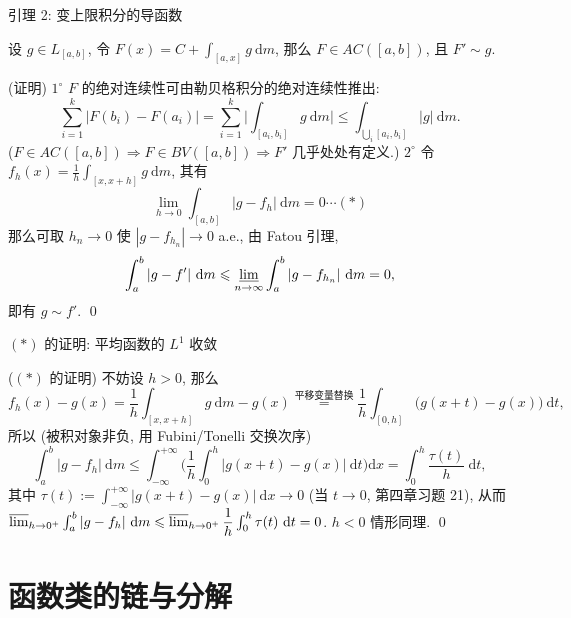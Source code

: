
\begin{frame}{引理 2: 变上限积分的导函数}

\begin{lem}
设 $g \in L_{[a, b]}$, 令 $F(x) = C + \int_{[a, x]} g ~ \mathrm{d} m$,
那么 $F \in AC([a, b])$, 且 $F' \sim g$.
\end{lem}

\startproof[bg=yellow, fg=red](证明)
$1^{\circ}$ $F$ 的绝对连续性可由勒贝格积分的绝对连续性推出:
\[
\sum_{i=1}^{k} \big| F(b_i) - F(a_i) \big|
= \sum_{i=1}^{k} \Big| \int_{[a_i, b_i]} g ~ \mathrm{d} m \Big|
\leqslant \int_{\bigcup_i [a_i, b_i]} |g| ~ \mathrm{d} m .
\]
($F \in AC([a, b]) \Rightarrow F \in BV([a, b]) \Rightarrow F'$ 几乎处处有定义.) \quad
$2^{\circ}$ 令 $f_h(x) = \frac1h \int_{[x, x+h]} g ~ \mathrm{d} m$,
其有
\[
\lim_{h \to 0} \int_{[a, b]} |g - f_h| ~ \mathrm{d} m = 0 \cdots (\ast)
\]
那么可取 $h_n \to 0$ 使 $|g - f_{h_n}| \to 0$ a.e., 由 Fatou 引理,
\[
\int_a^b |g - f'| ~ \mathrm{d} m
\leqslant \varliminf_{n \to \infty} \int_a^b |g - f_{h_n}| ~ \mathrm{d} m = 0 ,
\]
即有 $g \sim f'$.
\qed

\end{frame}


\begin{frame}{$(\ast)$ 的证明: 平均函数的 $L^1$ 收敛}

\startproof[bg=yellow, fg=red]($(\ast)$ 的证明)
不妨设 $h > 0$, 那么
\[
f_h(x) - g(x)
= \frac1h \int_{[x, x+h]} g ~ \mathrm{d} m - g(x)
\overset{\text{平移变量替换}}{=}
\frac1h \int_{[0, h]} \big( g(x + t) - g(x) \big) ~ \mathrm{d} t ,
\]
所以 (被积对象非负, 用 Fubini/Tonelli 交换次序)
\[
\int_a^b |g - f_h| ~ \mathrm{d} m
\leqslant \int_{-\infty}^{+\infty}
\Big( \frac1h \int_0^h |g(x + t) - g(x)| ~ \mathrm{d} t \Big) \mathrm{d} x
= \int_0^h \frac{\tau(t)}{h} ~ \mathrm{d} t ,
\]
其中 $\tau(t) := \int_{-\infty}^{+\infty} |g(x + t) - g(x)| ~ \mathrm{d} x
\to 0$ (当 $t \to 0$, \alert{第四章习题 21}), 从而
$\varlimsup_{h \to 0^+} \int_a^b |g - f_h| ~ \mathrm{d} m
\leqslant \varlimsup_{h \to 0^+} \dfrac1h \int_0^h \tau(t) ~ \mathrm{d} t = 0$.
$h < 0$ 情形同理.
\qed

\end{frame}


\section[函数类链]{函数类的链与分解}

